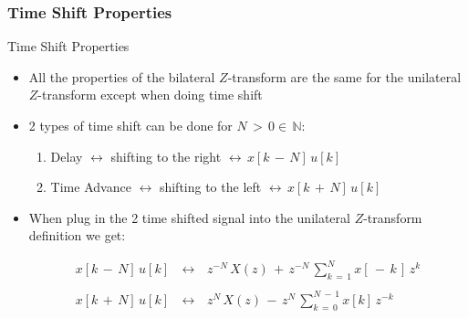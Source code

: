 \subsubsection{Time Shift Properties}

\begin{frame}[t]{Time Shift Properties}

\begin{itemize}

\item All the properties of the bilateral $Z$-transform are the same for the unilateral $Z$-transform except when doing time shift

\item 2 types of time shift can be done for $N \, > \, 0 \in \, \mathbb{N}$:

	\begin{enumerate}
	\item Delay $\leftrightarrow$ shifting to the right $\leftrightarrow \, x[k \,-\, N] \, u[k]$ 
	
	\item Time Advance $\leftrightarrow$ shifting to the left $\leftrightarrow \, x[k \,+\, N] \, u[k]$ 
	\end{enumerate}

\item When plug in the 2 time shifted signal into the unilateral $Z$-transform definition we get:

\begin{equation}
\begin{array}{rcl}
x[k \,-\, N] \, u[k] \, &\leftrightarrow& \, z^{-N} \, X(z) \, + \, z^{-N} \,   \displaystyle\sum_{k \, = \, 1}^{N} x[\, -\,k \,] \, z^k  \\ \\
x[k \,+ \, N] \, u[k] \, &\leftrightarrow& \, z^N \, X(z) \, - \, z^N \,   \displaystyle\sum_{k \, = \, 0}^{N \ - \, 1} x[k] \, z^{-k}
\end{array}
\end{equation} 

\end{itemize}

\end{frame}

